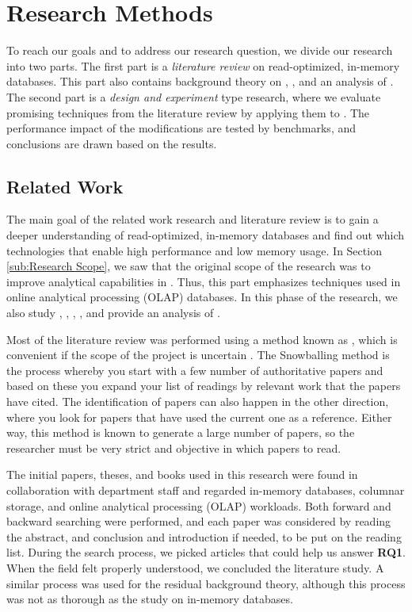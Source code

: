 \section{Research Methods}
\label{sec:Methodology}
To reach our goals and to address our research question, we divide our research into two parts. The first part is a \textit{literature review} on read-optimized, in-memory databases. This part also contains background theory on \mde, \bi, and an analysis of \gap. The second part is a \textit{design and experiment} type research, where we evaluate promising techniques from the literature review by applying them to \gap. The performance impact of the modifications are tested by benchmarks, and conclusions are drawn based on the results.

\subsection{Related Work}
\label{sub:Literature Review}
The main goal of the related work research and literature review is to gain a deeper understanding of read-optimized, in-memory databases and find out which technologies that enable high performance and low memory usage. In Section \ref{sub:Research Scope}, we saw that the original scope of the research was to improve analytical capabilities in \gap. Thus, this part emphasizes techniques used in online analytical processing (OLAP) databases. In this phase of the research, we also study \mde, \bi, \bd, \delphi, and provide an analysis of \gap.

Most of the literature review was performed using a method known as , which is convenient if the scope of the project is uncertain \cite{Ang2014-nm}. The Snowballing method is the process whereby you start with a few number of authoritative papers and based on these you expand your list of readings by relevant work that the papers have cited. The identification of papers can also happen in the other direction, where you look for papers that have used the current one as a reference. Either way, this method is known to generate a large number of papers, so the researcher must be very strict and objective in which papers to read.

The initial papers, theses, and books used in this research were found in collaboration with department staff and regarded in-memory databases, columnar storage, and online analytical processing (OLAP) workloads. Both forward and backward searching were performed, and each paper was considered by reading the abstract, and conclusion and introduction if needed, to be put on the reading list. During the search process, we picked articles that could help us answer \textbf{RQ1}. When the field felt properly understood, we concluded the literature study. A similar process was used for the residual background theory, although this process was not as thorough as the study on in-memory databases.


